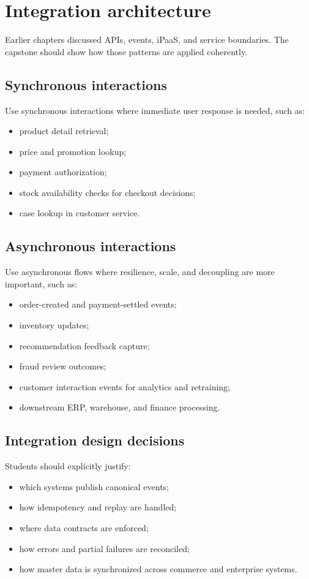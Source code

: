 \section{Integration architecture}
Earlier chapters discussed APIs, events, iPaaS, and service boundaries. The capstone should show how those patterns are applied coherently.

\subsection{Synchronous interactions}
Use synchronous interactions where immediate user response is needed, such as:
\begin{itemize}
  \item product detail retrieval;
  \item price and promotion lookup;
  \item payment authorization;
  \item stock availability checks for checkout decisions;
  \item case lookup in customer service.
\end{itemize}

\subsection{Asynchronous interactions}
Use asynchronous flows where resilience, scale, and decoupling are more important, such as:
\begin{itemize}
  \item order-created and payment-settled events;
  \item inventory updates;
  \item recommendation feedback capture;
  \item fraud review outcomes;
  \item customer interaction events for analytics and retraining;
  \item downstream ERP, warehouse, and finance processing.
\end{itemize}

\subsection{Integration design decisions}
Students should explicitly justify:
\begin{itemize}
  \item which systems publish canonical events;
  \item how idempotency and replay are handled;
  \item where data contracts are enforced;
  \item how errors and partial failures are reconciled;
  \item how master data is synchronized across commerce and enterprise systems.
\end{itemize}

